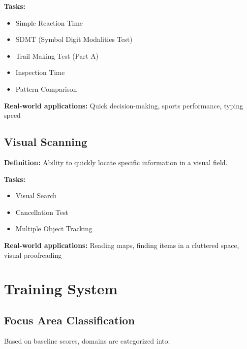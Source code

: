 \documentclass[12pt,a4paper]{article}
\begin{document}
\textbf{Tasks:}
\begin{itemize}
    \item Simple Reaction Time
    \item SDMT (Symbol Digit Modalities Test)
    \item Trail Making Test (Part A)
    \item Inspection Time
    \item Pattern Comparison
\end{itemize}

\textbf{Real-world applications:} Quick decision-making, sports performance, typing speed

\subsection{Visual Scanning}

\textbf{Definition:} Ability to quickly locate specific information in a visual field.

\textbf{Tasks:}
\begin{itemize}
    \item Visual Search
    \item Cancellation Test
    \item Multiple Object Tracking
\end{itemize}

\textbf{Real-world applications:} Reading maps, finding items in a cluttered space, visual proofreading

\section{Training System}

\subsection{Focus Area Classification}

Based on baseline scores, domains are categorized into:
\end{document}
